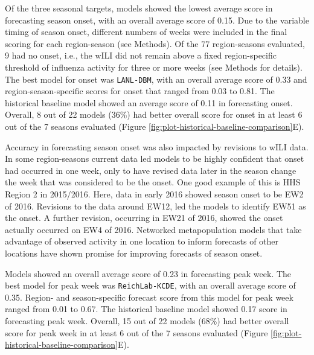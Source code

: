 \documentclass[9pt,twocolumn,twoside]{pnas-new}\usepackage[]{graphicx}\usepackage[]{color}
\begin{document}
Of the three seasonal targets, models showed the lowest average score in forecasting season onset, with an overall average score of 
0.15. 
Due to the variable timing of season onset, different numbers of weeks were included in the final scoring for each region-season (see Methods). 
Of the 77 region-seasons evaluated, 9 had no onset, i.e., the wILI did not remain above a fixed region-specific threshold of influenza activity for three or more weeks (see Methods for details). 
The best model for onset was 
{\tt LANL-DBM}, 
with an overall average score of 
0.33
and region-season-specific scores for onset that ranged from
0.03 to 
0.81.
The historical baseline model showed an average score of 
0.11 in forecasting onset.
Overall, 8 out of 22 models (36\%) had better overall score for onset in at least 6 out of the 7 seasons evaluated (Figure \ref{fig:plot-historical-baseline-comparison}E).

Accuracy in forecasting season onset was also impacted by revisions to wILI data. In some region-seasons current data led models to be highly confident that onset had occurred in one week, only to have revised data later in the season change the week that was considered to be the onset. One good example of this is HHS Region 2 in 2015/2016. Here, data in early 2016 showed season onset to be EW2 of 2016. Revisions to the data around EW12, led the models to identify EW51 as the onset. A further revision, occurring in EW21 of 2016, showed the onset actually occurred on EW4 of 2016.
Networked metapopulation models that take advantage of observed activity in one location to inform forecasts of other locations have shown promise for improving forecasts of season onset.\cite{Pei2018}



Models showed an overall average score of 
0.23
in forecasting peak week. 
The best model for peak week was 
{\tt ReichLab-KCDE}, 
with an overall average score of 
0.35. 
Region- and season-specific forecast score from this model for peak week ranged from
0.01 to 
0.67.
The historical baseline model showed 
0.17 
score in forecasting peak week.
Overall, 15 out of 22 models (68\%) had better overall score for peak week in at least 6 out of the 7 seasons evaluated (Figure \ref{fig:plot-historical-baseline-comparison}E).
\end{document}

